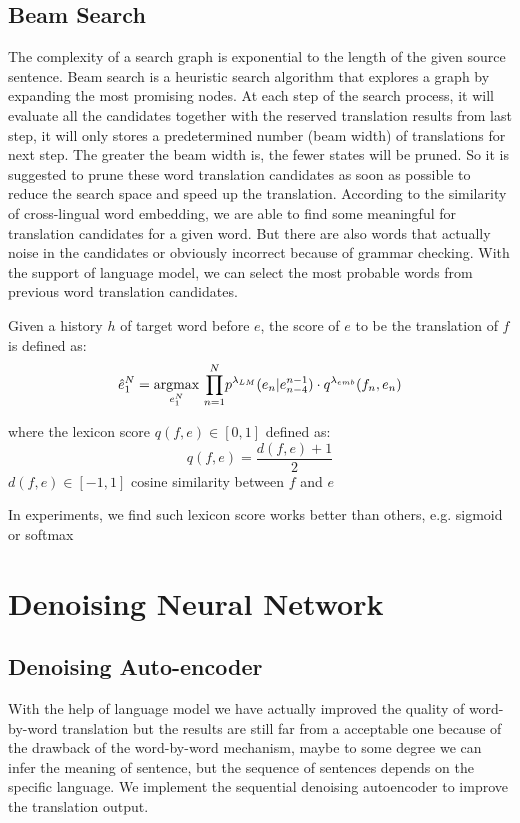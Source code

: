 	\subsection{Beam Search}
	The complexity of a search graph is exponential to the length of the given source sentence. Beam search is a heuristic search algorithm that explores a graph by expanding the most promising nodes. At each step of the search process, it will evaluate all the candidates together with the reserved translation results from last step, it will only stores a predetermined number (beam width) of translations for next step. The greater the beam width is, the fewer states will be pruned. 	
	So it is suggested to prune these word translation candidates as soon as possible to reduce the search space and speed up the translation. According to the similarity of cross-lingual word embedding, we are able to find some meaningful for translation candidates for a given word. But there are also words that actually noise in the candidates or obviously incorrect because of grammar checking. With the support of language model, we can select the most probable words from previous word translation candidates.
	
	Given a history ${h}$ of target word before ${e}$, the score of $e$ to be the translation of ${f}$ is defined as:
	\[ \hat{e}_1^N = \underset{e_1^N}{\operatorname{argmax}}{\ \prod_{n=1}^{N}} {p^{\lambda_{LM}}(e_n|e_{n-4}^{n-1}) \cdot q^{\lambda_{emb}}(f_n,e_n)}\]

 	where the lexicon score ${q(f,e) \in [0,1]}$ defined as:
 	\[q(f,e) = \frac{d(f,e)+1}{2} \]
 	${d(f,e)\in [-1,1]}$ cosine similarity between ${f}$ and ${e}$
	
	
	In experiments, we find such lexicon score works better than others, e.g. sigmoid or softmax
	
\section{Denoising Neural Network}
\subsection{Denoising Auto-encoder}
	With the help of language model we have actually improved the quality of word-by-word translation but the results are still far from a acceptable one because of the drawback of the word-by-word mechanism, maybe to some degree we can infer the meaning of sentence, but the sequence of sentences depends on the specific language. We implement the sequential denoising autoencoder to improve the translation output.
	
